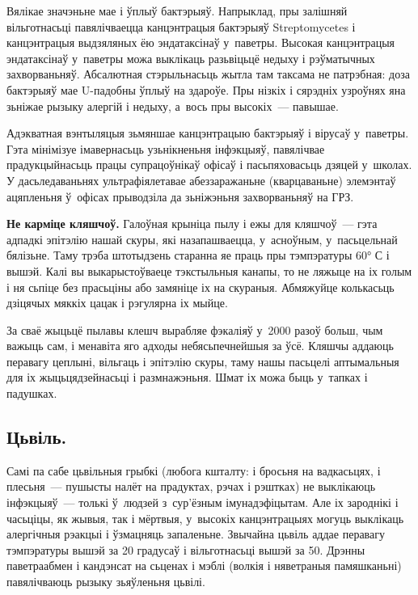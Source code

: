 Вялікае значэньне мае і ўплыў бактэрыяў. Напрыклад, пры залішняй вільготнасьці павялічваецца канцэнтрацыя бактэрыяў Streptomycetes і канцэнтрацыя выдзяляных ёю эндатаксінаў у~паветры. Высокая канцэнтрацыя эндатаксінаў у~паветры можа выклікаць разьвіцьцё недыху і рэўматычных захворваньняў. Абсалютная стэрыльнасьць жытла там таксама не патрэбная: доза бактэрыяў мае U-падобны ўплыў на здароўе. Пры нізкіх і сярэдніх узроўнях яна зьніжае рызыку алергій і недыху, а~вось пры высокіх~--- павышае.

Адэкватная вэнтыляцыя зьмяншае канцэнтрацыю бактэрыяў і вірусаў у~паветры. Гэта мінімізуе імавернасьць узьнікненьня інфэкцыяў, павялічвае прадукцыйнасьць працы супрацоўнікаў офісаў і пасьпяховасьць дзяцей у~школах. У дасьледаваньнях ультрафіялетавае абеззаражаньне (кварцаваньне) элемэнтаў ацяпленьня ў~офісах прыводзіла да зьніжэньня захворваньняў на ГРЗ.


\textbf{Не карміце кляшчоў.} Галоўная крыніца пылу і ежы для кляшчоў~--- гэта адпадкі эпітэлію нашай скуры, які назапашваецца, у~асноўным, у~пасьцельнай бялізьне. Таму трэба штотыдзень старанна яе праць пры тэмпэратуры 60° С і вышэй. Калі вы выкарыстоўваеце тэкстыльныя канапы, то не ляжыце на іх голым і ня сьпіце без прасьціны або замяніце іх на скураныя. Абмяжуйце колькасьць дзіцячых мяккіх цацак і рэгулярна іх мыйце.

За сваё жыцьцё пылавы клешч вырабляе фэкаліяў у~2000 разоў больш, чым важыць сам, і менавіта яго адходы небясьпечнейшыя за ўсё. Кляшчы аддаюць перавагу цеплыні, вільгаць і эпітэлію скуры, таму нашы пасьцелі аптымальныя для іх жыцьцядзейнасьці і размнажэньня. Шмат іх можа быць у~тапках і падушках.

\subsection*{Цьвіль.}

Самі па сабе цьвільныя грыбкі (любога кшталту: і бросьня на вадкасьцях, і плесьня~--- пушысты налёт на прадуктах, рэчах і рэштках) не выклікаюць інфэкцыяў~--- толькі ў~людзей з~сур'ёзным імунадэфіцытам. Але іх зароднікі і часьціцы, як жывыя, так і мёртвыя, у~высокіх канцэнтрацыях могуць выклікаць алергічныя рэакцыі і ўзмацняць запаленьне. Звычайна цьвіль аддае перавагу тэмпэратуры вышэй за 20 градусаў і вільготнасьці вышэй за 50. Дрэнны паветраабмен і кандэнсат на сьценах і мэблі (волкія і няветраныя памяшканьні) павялічваюць рызыку зьяўленьня цьвілі.

